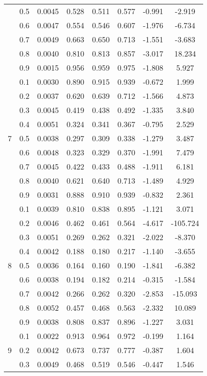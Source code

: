 \documentclass[11pt,a4paper]{report}
\begin{document}
\begin{longtable}{ | c | c || c | c | c | c | c | c | }
 & 0.5 & 0.0045 & 0.528 & 0.511 & 0.577 & -0.991 & -2.919 \\
 & 0.6 & 0.0047 & 0.554 & 0.546 & 0.607 & -1.976 & -6.734 \\
 & 0.7 & 0.0049 & 0.663 & 0.650 & 0.713 & -1.551 & -3.683 \\
 & 0.8 & 0.0040 & 0.810 & 0.813 & 0.857 & -3.017 & 18.234 \\
 & 0.9 & 0.0015 & 0.956 & 0.959 & 0.975 & -1.808 & 5.927 \\
 \hline
\multirow{9}{*}{7} & 0.1 & 0.0030 & 0.890 & 0.915 & 0.939 & -0.672 & 1.999 \\
 & 0.2 & 0.0037 & 0.620 & 0.639 & 0.712 & -1.566 & 4.873 \\
 & 0.3 & 0.0045 & 0.419 & 0.438 & 0.492 & -1.335 & 3.840 \\
 & 0.4 & 0.0051 & 0.324 & 0.341 & 0.367 & -0.795 & 2.529 \\
 & 0.5 & 0.0038 & 0.297 & 0.309 & 0.338 & -1.279 & 3.487 \\
 & 0.6 & 0.0048 & 0.323 & 0.329 & 0.370 & -1.991 & 7.479 \\
 & 0.7 & 0.0045 & 0.422 & 0.433 & 0.488 & -1.911 & 6.181 \\
 & 0.8 & 0.0040 & 0.621 & 0.640 & 0.713 & -1.489 & 4.929 \\
 & 0.9 & 0.0031 & 0.888 & 0.910 & 0.939 & -0.832 & 2.361 \\
 \hline
\multirow{9}{*}{8} & 0.1 & 0.0039 & 0.810 & 0.838 & 0.895 & -1.121 & 3.071 \\
 & 0.2 & 0.0046 & 0.462 & 0.461 & 0.564 & -4.617 & -105.724 \\
 & 0.3 & 0.0051 & 0.269 & 0.262 & 0.321 & -2.022 & -8.370 \\
 & 0.4 & 0.0042 & 0.188 & 0.180 & 0.217 & -1.140 & -3.655 \\
 & 0.5 & 0.0036 & 0.164 & 0.160 & 0.190 & -1.841 & -6.382 \\
 & 0.6 & 0.0038 & 0.194 & 0.182 & 0.214 & -0.315 & -1.584 \\
 & 0.7 & 0.0042 & 0.266 & 0.262 & 0.320 & -2.853 & -15.093 \\
 & 0.8 & 0.0052 & 0.457 & 0.468 & 0.563 & -2.332 & 10.089 \\
 & 0.9 & 0.0038 & 0.808 & 0.837 & 0.896 & -1.227 & 3.031 \\
 \hline
\multirow{9}{*}{9} & 0.1 & 0.0022 & 0.913 & 0.964 & 0.972 & -0.199 & 1.164 \\
 & 0.2 & 0.0042 & 0.673 & 0.737 & 0.777 & -0.387 & 1.604 \\
 & 0.3 & 0.0049 & 0.468 & 0.519 & 0.546 & -0.447 & 1.546 \\

\end{longtable}
\end{document}
